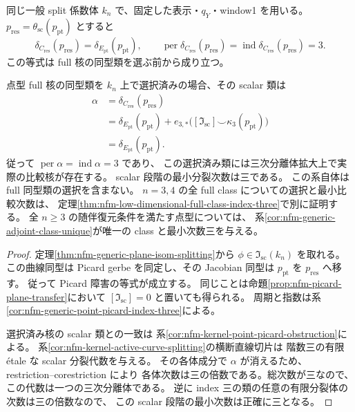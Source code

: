 \begin{corollary}
\label{cor:nfm-generic-residual-picard-index-three}
同じ一般 split 係数体 $k_n$ で、固定した表示・$q_Y$・window1 を用いる。
$p_{\mathrm{res}}=\theta_{\mathrm{sc}}(p_{\mathrm{pt}})$ とすると
\[
 \delta_{C_{\mathrm{res}}}(p_{\mathrm{res}})
   =\delta_{E_{\mathrm{pt}}}(p_{\mathrm{pt}}),\qquad
 \operatorname{per}\delta_{C_{\mathrm{res}}}(p_{\mathrm{res}})
   =\operatorname{ind}\delta_{C_{\mathrm{res}}}(p_{\mathrm{res}})=3.
\]
この等式は full 核の同型類を選ぶ前から成り立つ。

点型 full 核の同型類を $k_n$ 上で選択済みの場合、その scalar 類は
\begin{equation}\label{eq:nfm-point-full-obstruction-dichotomy}
 \begin{split}
 \alpha
 &=\delta_{C_{\mathrm{res}}}(p_{\mathrm{res}})\\
 &=\delta_{E_{\mathrm{pt}}}(p_{\mathrm{pt}})
   +e_{3,*}\bigl([\mathfrak I_{\mathrm{sc}}]
                     \smile\kappa_3(p_{\mathrm{pt}})\bigr)\\
 &=\delta_{E_{\mathrm{pt}}}(p_{\mathrm{pt}}).
 \end{split}
\end{equation}
従って $\operatorname{per}\alpha=\operatorname{ind}\alpha=3$ であり、
この選択済み類には三次分離体拡大上で実際の比較核が存在する。
scalar 段階の最小分裂次数は三である。
この系自体は full 同型類の選択を含まない。
$n=3,4$ の全 full class についての選択と最小比較次数は、
定理\ref{thm:nfm-low-dimensional-full-class-index-three}で別に証明する。
全 $n\ge3$ の随伴復元条件を満たす点型については、
系\ref{cor:nfm-generic-adjoint-class-unique}が唯一の class と最小次数三を与える。
\end{corollary}

\begin{proof}
定理\ref{thm:nfm-generic-plane-isom-splitting}から
$\phi\in\mathfrak I_{\mathrm{sc}}(k_n)$ を取れる。
この曲線同型は Picard gerbe を同定し、その Jacobian 同型は
$p_{\mathrm{pt}}$ を $p_{\mathrm{res}}$ へ移す。
従って Picard 障害の等式が成立する。
同じことは命題\ref{prop:nfm-picard-plane-transfer}において
$[\mathfrak I_{\mathrm{sc}}]=0$ と置いても得られる。
周期と指数は系\ref{cor:nfm-generic-point-picard-index-three}による。

選択済み核の scalar 類との一致は
系\ref{cor:nfm-kernel-point-picard-obstruction}による。
系\ref{cor:nfm-kernel-active-curve-splitting}の横断直線切片は
階数三の有限 \'etale な scalar 分裂代数を与える。
その各体成分で $\alpha$ が消えるため、restriction--corestriction により
各体次数は三の倍数である。総次数が三なので、この代数は一つの三次分離体である。
逆に index 三の類の任意の有限分裂体の次数は三の倍数なので、
この scalar 段階の最小次数は正確に三となる。
\end{proof}

